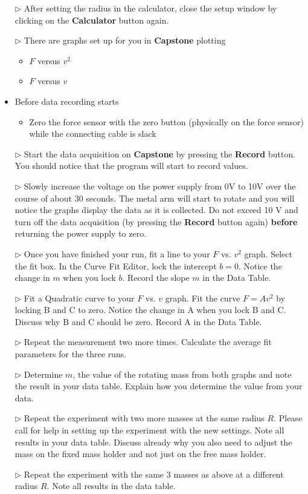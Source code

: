 \begin{itemize}
\item[$\triangleright$] After setting the radius in the calculator, close the setup window by clicking on the \textbf{Calculator} button again.
\item[$\triangleright$] There are graphs set up for you in \textbf{Capstone} plotting
\begin{itemize}
    \item $F$ versus $v^2$
    \item $F$ versus $v$
\end{itemize}
\item Before data recording starts
\begin{itemize}
    \item Zero the force sensor with the zero button (physically on the force sensor) while the connecting cable is slack
\end{itemize}
\item[$\triangleright$] Start the data acquisition on \textbf{Capstone} by pressing the \textbf{Record} button.
  You should notice that the program will start to record values.
\item[$\triangleright$] Slowly increase the voltage on the power supply from 0V to 10V over the course of about 30 seconds.
  The metal arm will start to rotate and you will notice the graphs display the data as it is collected.
  Do not exceed 10 V and turn off the data acquisition (by pressing the \textbf{Record} button again) \textbf{before} returning the power supply to zero.
\item[$\triangleright$] Once you have finished your run, fit a line to your $F$ vs. $v^2$ graph.
  Select the fit box.
  In the Curve Fit Editor, lock the intercept $b = 0$.
  Notice the change in $m$ when you lock $b$. Record the slope $m$ in the Data Table.
\item[$\triangleright$] Fit a Quadratic curve to your $F$ vs. $v$ graph.
  Fit the curve $F=A v^2$ by locking B and C to zero. Notice the change in A when you lock B and C.
  Discuss why B and C should be zero. Record A in the Data Table.
\item[$\triangleright$] Repeat the measurement two more times.
  Calculate the average fit parameters for the three runs.
\item[$\triangleright$] Determine $m$, the value of the rotating mass from both graphs and note the result in your data table.
  Explain how you determine the value from your data.
\item[$\triangleright$] Repeat the experiment with two more masses at the same radius $R$.
  Please call for help in setting up the experiment with the new settings.
  Note all results in your data table. Discuss already why you also need to adjust the mass on the fixed mass holder and not just on the free mass holder.
\item[$\triangleright$] Repeat the experiment with the same 3 masses as above at a different radius $R$.
  Note all results in the data table.
\end{itemize}

